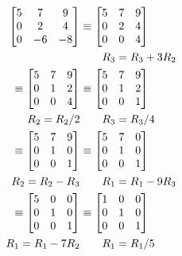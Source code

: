 \documentclass{../mathhomework}
\newenvironment{Mat}{\begin{bmatrix}}{\end{bmatrix}}
\begin{document}
\begin{problem}[1.7\#1]
    \begin{solution}
        \begin{align*}
            \begin{Mat}
                5 & 7 & 9 \\
                0 & 2 & 4 \\
                0 & -6 & -8
            \end{Mat} 
            & \equiv \begin{Mat}
                5 & 7 & 9 \\
                0 & 2 & 4 \\
                0 & 0 & 4
            \end{Mat} 
            \\ 
            & \qquad{} R_3 = R_3 + 3R_2 \\
            \equiv \begin{Mat}
                5 & 7 & 9 \\
                0 & 1 & 2 \\
                0 & 0 & 4
            \end{Mat}
            & \equiv \begin{Mat}
                5 & 7 & 9 \\
                0 & 1 & 2 \\
                0 & 0 & 1
            \end{Mat}
            \\ 
            R_2 = R_2/2 & \qquad{} R_3 = R_3/4 \\
            \equiv \begin{Mat}
                5 & 7 & 9 \\
                0 & 1 & 0 \\
                0 & 0 & 1
            \end{Mat}
            & \equiv \begin{Mat}
                5 & 7 & 0 \\
                0 & 1 & 0 \\
                0 & 0 & 1
            \end{Mat}
            \\
            R_2 = R_2 - R_3 & \qquad{} R_1 = R_1 - 9R_3 \\ 
            \equiv \begin{Mat}
                5 & 0 & 0 \\
                0 & 1 & 0 \\
                0 & 0 & 1
            \end{Mat}
            & \equiv \begin{Mat}
                1 & 0 & 0 \\
                0 & 1 & 0 \\
                0 & 0 & 1
            \end{Mat}
            \\ 
            R_1 = R_1 - 7R_2 & \qquad{} R_1 = R_1/5
        \end{align*}


\end{solution}
\end{problem}
\end{document}
